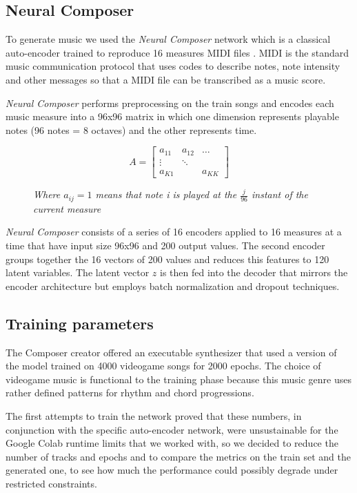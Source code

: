 \documentclass[10pt,twocolumn,letterpaper]{article}
\begin{document}
\subsection{Neural Composer}
To generate music we used the \textit{Neural Composer} network which is a classical auto-encoder trained to reproduce 16 measures MIDI files \cite{MidiWiki}. %
MIDI is the standard music communication protocol that uses codes to describe notes, note intensity and other messages so that a MIDI file can be transcribed as a music score.

\textit{Neural Composer} performs preprocessing on the train songs and encodes each music measure into a 96x96 matrix in which one dimension represents playable notes (96 notes = 8 octaves) and the other represents time.
\begin{figure}[!h]
    \centering
    \[
    A = \begin{bmatrix} 
        a_{11} & a_{12} & \dots \\
        \vdots & \ddots & \\
        a_{K1} &        & a_{KK} 
        \end{bmatrix}
        \]
    \caption{\textit{Where $a_{ij}=1$ means that note i is played at the $\frac{j}{96}$ instant of the current measure}}
\end{figure}

\textit{Neural Composer} consists of a series of 16 encoders applied to 16 measures at a time that have input size 96x96 and 200 output values. The second encoder groups together the 16 vectors of 200 values and reduces this features to 120 latent variables. The latent vector $z$ is then fed into the decoder that mirrors the encoder architecture but employs batch normalization and dropout techniques.

\subsection{Training parameters}
The Composer creator offered an executable synthesizer that used a version of the model trained on 4000 videogame songs for 2000 epochs.
The choice of videogame music is functional to the training phase because this music genre uses rather defined patterns for rhythm and chord progressions.

The first attempts to train the network %
proved that these numbers, in conjunction with the specific auto-encoder network, were unsustainable for the Google Colab runtime limits that we worked with, so we decided to reduce the number of tracks and epochs and to compare the metrics on the train set and the generated one, to see how much the performance could possibly degrade under restricted constraints.
\end{document}
